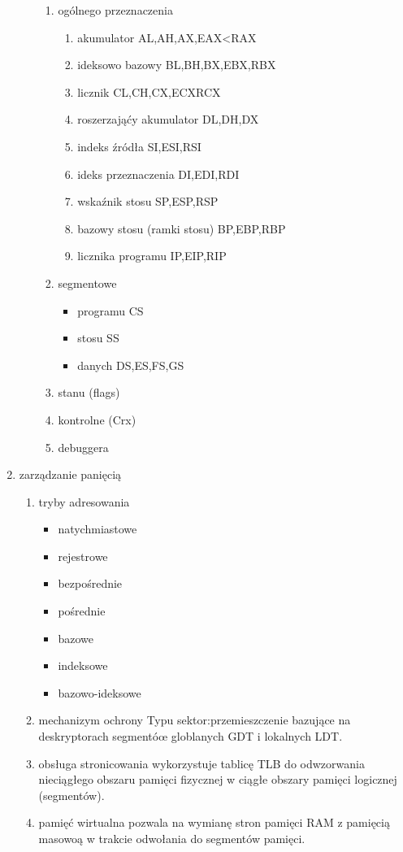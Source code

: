 \documentclass[11pt]{article}
\begin{document}
\begin{enumerate}
\begin{enumerate}
\begin{enumerate}
\item ogólnego przeznaczenia
\label{sec:org447acce}
\begin{enumerate}
\item akumulator
\label{sec:orgc053727}
AL,AH,AX,EAX<RAX
\item ideksowo bazowy
\label{sec:orgdbb11ec}
BL,BH,BX,EBX,RBX
\item licznik
\label{sec:org9b95a90}
CL,CH,CX,ECXRCX
\item roszerzająćy akumulator
\label{sec:orgbef8cae}
DL,DH,DX
\item indeks źródła SI,ESI,RSI
\label{sec:org48aaf42}
\item ideks przeznaczenia
\label{sec:org7404185}
DI,EDI,RDI
\item wskaźnik stosu
\label{sec:org90ed1aa}
SP,ESP,RSP
\item bazowy stosu (ramki stosu)
\label{sec:orgd22785a}
BP,EBP,RBP
\item licznika programu
\label{sec:org22051d6}
IP,EIP,RIP
\end{enumerate}
\item segmentowe
\label{sec:org68813b1}
\begin{itemize}
\item programu CS
\item stosu SS
\item danych DS,ES,FS,GS
\end{itemize}
\item stanu (flags)
\label{sec:orgef44651}
\item kontrolne (Crx)
\label{sec:org076bf8c}
\item debuggera
\label{sec:org14130e3}
\end{enumerate}
\end{enumerate}
\item zarządzanie panięcią
\label{sec:org2bfdcad}
\begin{enumerate}
\item tryby adresowania
\label{sec:orgfe83394}
\begin{itemize}
\item natychmiastowe
\item rejestrowe
\item bezpośrednie
\item pośrednie
\item bazowe
\item indeksowe
\item bazowo-ideksowe
\end{itemize}
\item mechanizym ochrony
\label{sec:org68dd66c}
Typu sektor:przemieszczenie bazujące na deskryptorach segmentóœ globlanych GDT i lokalnych LDT.
\item obsługa stronicowania
\label{sec:orgde4aa5b}
wykorzystuje tablicę TLB do odwzorwania nieciągłego obszaru pamięci fizycznej w ciągłe obszary pamięci logicznej (segmentów).
\item pamięć wirtualna
\label{sec:org2d563c3}
pozwala na wymianę stron pamięci RAM z pamięcią masowoą w trakcie odwołania do segmentów pamięci.
\end{enumerate}
\end{enumerate}
\end{document}
